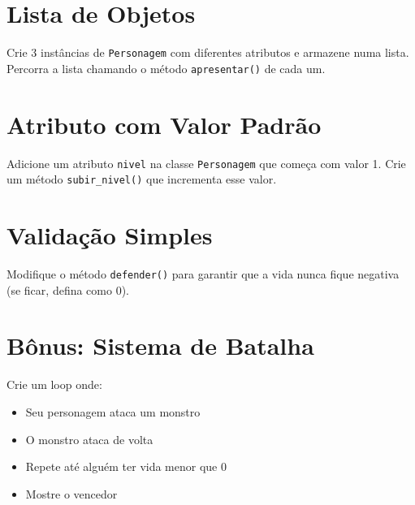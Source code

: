 \section{Lista de Objetos}
Crie 3 instâncias de \texttt{Personagem} com diferentes atributos e armazene numa lista. Percorra a lista chamando o método \texttt{apresentar()} de cada um.

\section{Atributo com Valor Padrão}
Adicione um atributo \texttt{nivel} na classe \texttt{Personagem} que começa com valor 1. Crie um método \texttt{subir\_nivel()} que incrementa esse valor.

\section{Validação Simples}
Modifique o método \texttt{defender()} para garantir que a vida nunca fique negativa (se ficar, defina como 0).

\section{Bônus: Sistema de Batalha}
Crie um loop onde:
\begin{itemize}
    \item Seu personagem ataca um monstro
    \item O monstro ataca de volta
    \item Repete até alguém ter vida menor que 0
    \item Mostre o vencedor
\end{itemize}

